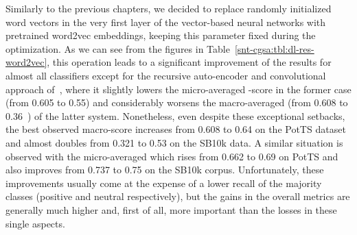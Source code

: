 Similarly to the previous chapters, we decided to replace randomly
initialized word vectors in the very first layer of the vector-based
neural networks with pretrained word2vec embeddings, keeping this
parameter fixed during the optimization.  As we can see from the
figures in Table~\ref{snt-cgsa:tbl:dl-res-word2vec}, this operation
leads to a significant improvement of the results for almost all
classifiers except for the recursive auto-encoder and convolutional
approach of~\citet{Severyn:15}, where it slightly lowers the
micro-averaged \F-score in the former case (from 0.605 to 0.55) and
considerably worsens the macro-averaged \F{} (from 0.608 to 0.36~\F)
of the latter system.  Nonetheless, even despite these exceptional
setbacks, the best observed macro-score increases from 0.608 to 0.64
on the PotTS dataset and almost doubles from 0.321 to 0.53 on the
SB10k data.  A similar situation is observed with the micro-averaged
\F{} which rises from 0.662 to 0.69 on PotTS and also improves from
0.737 to 0.75 on the SB10k corpus.  Unfortunately, these improvements
usually come at the expense of a lower recall of the majority classes
(positive and neutral respectively), but the gains in the overall
metrics are generally much higher and, first of all, more important
than the losses in these single aspects.


